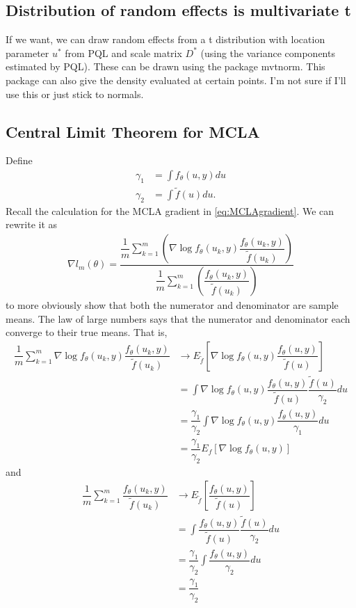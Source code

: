 \documentclass{article}
\begin{document}
\subsection{Distribution of random effects is multivariate t}\label{sec:tee}
If we want, we can draw random effects from a t distribution with location parameter $u^*$ from PQL and scale matrix $D^*$ (using the variance components estimated by PQL). These can be drawn using the package mvtnorm. This package can also give the density evaluated at certain points. I'm not sure if I'll use this or just stick to normals.

\subsection{Central Limit Theorem for MCLA}
Define
\begin{align}
\gamma_1&= \int f_\theta(u,y) du\\
\gamma_2 &=\int \tilde{f}(u)du.
\end{align}
Recall the calculation for the MCLA gradient in  \eqref{eq:MCLAgradient}. We can rewrite it as
\begin{align}
\nabla l_m(\theta)=  \dfrac{\dfrac{1}{m}\sum_{k=1}^m    \left( \nabla \log f_\theta(u_k,y)   \dfrac{f_\theta(u_k,y)}{\tilde{f}(u_k)} \right)}{\dfrac{1}{m} \sum_{k=1}^m \left( \dfrac{f_\theta(u_k,y)}{\tilde{f}(u_k)} \right) }
\end{align}
to more obviously show that both the numerator and denominator are sample means. 
The law of large numbers says that the numerator and denominator  each converge to their true means. That is,
\begin{align}
\dfrac{1}{m}\sum_{k=1}^m \nabla \log f_\theta (u_k,y)  \dfrac{f_\theta(u_k,y)}{\tilde{f}(u_k)} &\rightarrow  E_{\tilde{f}} \left[ \nabla \log f_\theta (u,y)  \dfrac{f_\theta(u,y)}{\tilde{f}(u)}  \right] \\
&= \int \nabla \log f_\theta (u,y)  \dfrac{f_\theta(u,y)}{\tilde{f}(u)} \dfrac{\tilde{f}(u)}{\gamma_2} du\\
&= \dfrac{\gamma_1}{\gamma_2} \int \nabla \log f_\theta (u,y)  \dfrac{f_\theta(u,y)}{\gamma_1}  du \\
&=\dfrac{\gamma_1}{\gamma_2} E_f \left[ \nabla \log f_\theta(u,y)  \right]
\end{align}
and
\begin{align}
\dfrac{1}{m}\sum_{k=1}^m \dfrac{f_\theta(u_k,y)}{\tilde{f}(u_k)} &\rightarrow E_{\tilde{f}} \left[ \dfrac{f_\theta(u,y)}{\tilde{f}(u)}  \right] \\
&= \int \dfrac{f_\theta(u,y)}{\tilde{f}(u)} \dfrac{\tilde{f}(u)}{\gamma_2} du\\
&= \dfrac{\gamma_1}{\gamma_2} \int \dfrac{ f_\theta(u,y)}{\gamma_2} du \\
&= \dfrac{\gamma_1}{\gamma_2}
\end{align}
\end{document}
